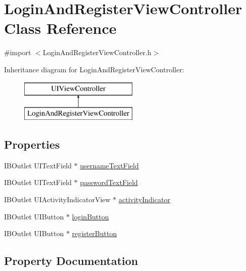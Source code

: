 \hypertarget{interface_login_and_register_view_controller}{}\section{Login\+And\+Register\+View\+Controller Class Reference}
\label{interface_login_and_register_view_controller}


{\ttfamily \#import $<$Login\+And\+Register\+View\+Controller.\+h$>$}

Inheritance diagram for Login\+And\+Register\+View\+Controller\+:\begin{figure}[H]
\begin{center}
\leavevmode
\includegraphics[height=2.000000cm]{interface_login_and_register_view_controller}
\end{center}
\end{figure}
\subsection*{Properties}
\begin{DoxyCompactItemize}
\item 
I\+B\+Outlet U\+I\+Text\+Field $\ast$ \hyperlink{interface_login_and_register_view_controller_aeb58d304082f61d7f0e475ad48965071}{username\+Text\+Field}
\item 
I\+B\+Outlet U\+I\+Text\+Field $\ast$ \hyperlink{interface_login_and_register_view_controller_a3fe868981ba2b35e7a05f3fd3180b339}{password\+Text\+Field}
\item 
I\+B\+Outlet U\+I\+Activity\+Indicator\+View $\ast$ \hyperlink{interface_login_and_register_view_controller_ad7bed8eb040bfe06327477a28a9dd45d}{activity\+Indicator}
\item 
I\+B\+Outlet U\+I\+Button $\ast$ \hyperlink{interface_login_and_register_view_controller_a5120910e3a7242d84d7c0ec954dc3b0a}{login\+Button}
\item 
I\+B\+Outlet U\+I\+Button $\ast$ \hyperlink{interface_login_and_register_view_controller_a899212d8e6ce12136c6051ad3c00ccff}{register\+Button}
\end{DoxyCompactItemize}


\subsection{Property Documentation}
\hypertarget{interface_login_and_register_view_controller_ad7bed8eb040bfe06327477a28a9dd45d}{}\label{interface_login_and_register_view_controller_ad7bed8eb040bfe06327477a28a9dd45d} 
